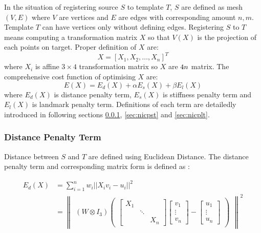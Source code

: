 In the situation of registering source $S$ to template $T$, $S$ are defined as mesh $(V,E)$ where $V$ are vertices and $E$ are edges with corresponding amount $n, m$. Template $T$ can have vertices only without defining edges. Registering $S$ to $T$ means computing a transformation matrix $X$ so that $V(X)$ is the projection of each points on target. Proper definition of $X$ are:
\begin{equation}
\label{eq:nicpX}
X=[X_1,X_2,\dotsc,X_n]^T
\end{equation}
where $X_i$ is affine $3\times 4$ transformation matrix so $X$ are $4n\time 3$ matrix. The comprehensive cost function of optimising $X$ are:
\begin{equation}
E(X)=E_d(X)+\alpha E_s(X)+\beta E_l(X)
\end{equation}
where $E_d(X)$ is distance penalty term, $E_s(X)$ is stiffness penalty term and $E_l(X)$ is landmark penalty term. Definitions of each term are detailedly introduced in following sections \ref{sec:nicpdt}, \ref{sec:nicpst} and \ref{sec:nicplt}.

\subsubsection{Distance Penalty Term}
\label{sec:nicpdt}

Distance between $S$ and $T$ are defined using Euclidean Distance. The distance penalty term and corresponding matrix form is defined as \cite{Amberg2007}:

\begin{align}
\label{eq:nicpdt}
E_d(X) &= \sum_{i=1}^n{w_i || X_i v_i - u_i ||^2} 
\\ &=
\begin{Vmatrix}
    (W \otimes I_3) 
    \begin{pmatrix}
        \begin{bmatrix}
        X_1 &  &  \\  & \ddots &  \\ &  & X_n
        \end{bmatrix}
        \begin{bmatrix}
        v_1 \\ \vdots \\ v_n
        \end{bmatrix}
        -
        \begin{bmatrix}
        u_1 \\ \vdots \\ u_n
        \end{bmatrix}
    \end{pmatrix}
\end{Vmatrix}
^2
\end{align}

